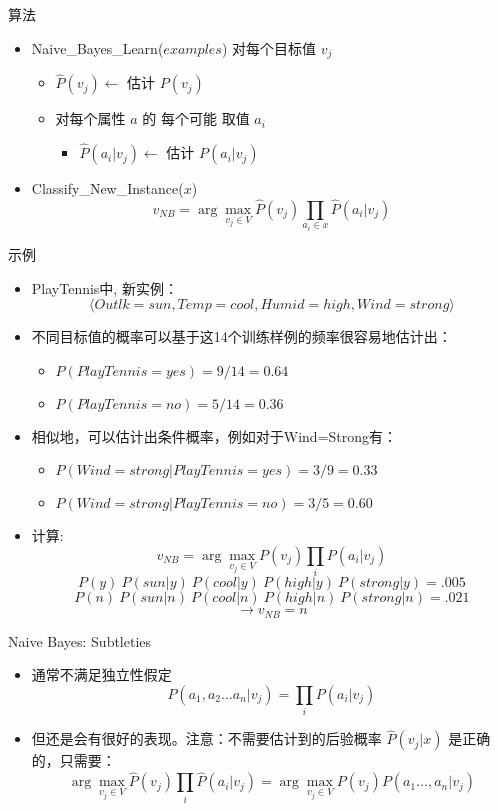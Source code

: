 \documentclass[presentation]{beamer}
\begin{document}
\begin{frame}[label={sec:org758f4a1}]{算法}
\begin{itemize}
\item Naive\_Bayes\_Learn(\(examples\))
对每个目标值 \(v_j\)
\begin{itemize}
\item \(\hat{P}(v_j) \leftarrow\) 估计 \(P(v_j)\)
\item 对每个属性 \(a\) 的 每个可能 取值 \(a_i\) 
\begin{itemize}
\item \(\hat{P}(a_i|v_j) \leftarrow\) 估计 \(P(a_i|v_j)\)
\end{itemize}
\end{itemize}
\item Classify\_New\_Instance(\(x\))
$$v_{NB} = \arg \max_{v_{j} \in V} \hat{P}(v_{j}) \prod_{a_i \in x} \hat{P}(a_{i} | v_{j})$$
\end{itemize}
\end{frame}

\begin{frame}[label={sec:orgda87f5e}]{示例}
\begin{itemize}
\item PlayTennis中, 新实例： 
$$\langle Outlk=sun, Temp=cool, Humid=high, Wind=strong \rangle$$
\item 不同目标值的概率可以基于这14个训练样例的频率很容易地估计出：
\begin{itemize}
\item \(P(PlayTennis=yes)=9/14=0.64\)
\item \(P(PlayTennis=no)=5/14=0.36\)
\end{itemize}
\item 相似地，可以估计出条件概率，例如对于Wind=Strong有：
\begin{itemize}
\item \(P(Wind=strong|PlayTennis=yes)=3/9=0.33\)
\item \(P(Wind=strong|PlayTennis=no)=3/5=0.60\)
\end{itemize}
\item 计算:
$$v_{NB} = \arg \max_{v_{j} \in V} P(v_{j}) \prod_{i} P(a_{i} | v_{j})$$
\[P(y)\ P(sun|y)\ P(cool|y)\ P(high|y)\ P(strong|y) = .005 \]
\[P(n)\ P(sun|n)\ P(cool|n)\ P(high|n)\ P(strong|n) = .021 \]
\[ \rightarrow v_{NB} = n \]
\end{itemize}
\end{frame}

\begin{frame}[label={sec:org2279b23}]{Naive Bayes: Subtleties}
\begin{itemize}
\item 通常不满足独立性假定
$$P(a_{1}, a_{2} \ldots a_{n}|v_{j}) = \prod_{i} P(a_{i} | v_{j})$$
\item 但还是会有很好的表现。注意：不需要估计到的后验概率 \(\hat{P}(v_j|x)\) 是正确的，只需要：
$$\arg\max_{v_{j}\in V}\hat{P}(v_{j})\prod_{i}\hat{P}(a_{i}|v_{j})=\arg\max_{v_{j} \in V}  P(v_{j}) P(a_{1} \ldots, a_n | v_{j})$$
\end{itemize}
\end{frame}
\end{document}
